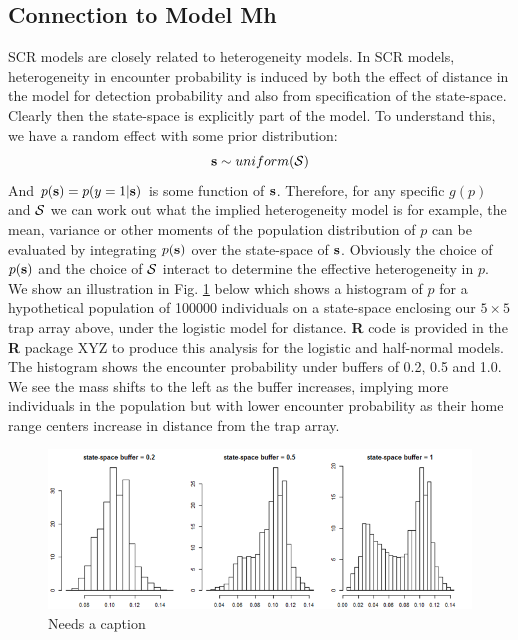 \subsection{Connection to Model Mh}  \label{scr0.sec.scrmh}

SCR models are closely related to heterogeneity models. In SCR models,
heterogeneity in encounter probability is induced by both the effect
of distance in the model for detection probability and also from
specification of the state-space. Clearly then the state-space is
explicitly part of the model. To understand this, we have a random
effect with some prior distribution:
\[
{\bf s} \sim uniform({\cal S})
\]
And $p({\bf s}) = p(y=1|{\bf s})$ is some function of ${\bf
  s}$. Therefore, for any specific $g(p)$ and ${\cal S}$ we can work
out what the implied heterogeneity model is for example, the mean,
variance or other moments of the population distribution of $p$ can be
evaluated by integrating $p({\bf s})$ over the state-space of ${\bf
  s}$.  Obviously the choice of $p({\bf s})$ and the choice of ${\cal
  S}$ interact to determine the effective heterogeneity in $p$. We
show an illustration in Fig. \ref{scr0.fig.buffereffect} below which
shows a histogram of $p$ for a hypothetical population of 100000
individuals on a state-space enclosing our $5 \times 5$ trap array
above, under the logistic model for distance. {\bf R} code is
provided in the {\bf R} package XYZ  to produce this analysis for the
logistic and half-normal models. The histogram shows the encounter
probability under buffers of 0.2, 0.5 and 1.0. We see the mass shifts
to the left as the buffer increases, implying more individuals in the
population but with lower encounter probability as their home range
centers increase in distance from the trap array.


\begin{figure}
\begin{center}
\includegraphics[width=5in]{figs/buffereffect}
\end{center}
\caption{Needs a caption}
\label{scr0.fig.buffereffect}
\end{figure}

